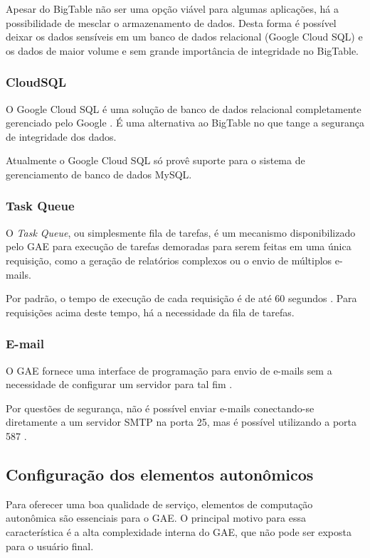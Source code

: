 \documentclass[12pt]{article}
\begin{document}
Apesar do BigTable não ser uma opção viável para algumas aplicações, há a
possibilidade de mesclar o armazenamento de dados. Desta forma é possível
deixar os dados sensíveis em um banco de dados relacional (Google Cloud SQL) e
os dados de maior volume e sem grande importância de integridade no BigTable.

\subsubsection{CloudSQL}

O Google Cloud SQL é uma solução de banco de dados relacional completamente
gerenciado pelo Google \cite{cloudsql}. É uma alternativa ao BigTable no que
tange a segurança de integridade dos dados.

Atualmente o Google Cloud SQL só provê suporte para o sistema de gerenciamento
de banco de dados MySQL.

\subsubsection{Task Queue}

O \textit{Task Queue}, ou simplesmente fila de tarefas, é um mecanismo
disponibilizado pelo GAE para execução de tarefas demoradas para serem feitas
em uma única requisição, como a geração de relatórios complexos ou o envio de
múltiplos e-mails.

Por padrão, o tempo de execução de cada requisição é de até 60 segundos \cite{timeout}. Para
requisições acima deste tempo, há a necessidade da fila de tarefas.

\subsubsection{E-mail}

O GAE fornece uma interface de programação para envio de e-mails sem a
necessidade de configurar um servidor para tal fim \cite{mail}.

Por questões de segurança, não é possível enviar e-mails conectando-se
diretamente a um servidor SMTP na porta 25, mas é possível utilizando a porta
587 \cite{sockets}.

\subsection{Configuração dos elementos autonômicos}

Para oferecer uma boa qualidade de serviço, elementos de computação autonômica
são essenciais para o GAE. O principal motivo para essa característica é a alta
complexidade interna do GAE, que não pode ser exposta para o usuário final.
\end{document}
